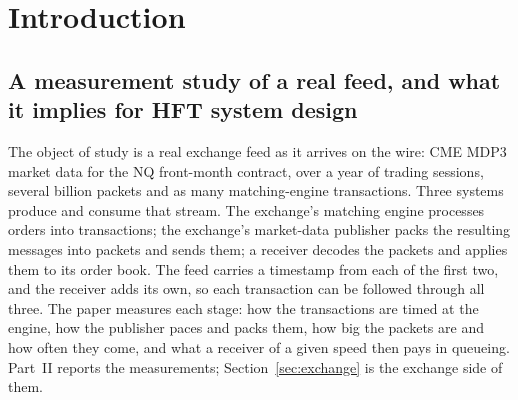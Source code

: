 \documentclass[11pt]{article}
\newcommand{\kasparhft}{\textsc{Kaspar-HFT}}
\begin{document}
\begin{abstract}
For system design, a receiver that handles every packet within one publisher period
does not queue on packet arrivals, however bursty the market; this is the design target.
Above the
publisher period a queueing tail appears and grows much faster than the service time. It
is produced by the timing of transactions, not by the packet rate, whose effect is
negligible at HFT service times, and not by packet size or packetisation. In this regime
the prevailing single-thread rule reverses: cutting the servicing chain into stages on separate threads
removes most of the tail for one hop on the median, only the slowest stage matters, and
for a stateless stage a pool of cores that each take whole packets does at least as
well. Just under the publisher period, where a production receiver that hands each packet
to a decoder thread runs, the tail that remains comes from packets of several messages,
decoded one after another, and from service times that vary from packet to packet; the
levers there are the cost per message and the spread of service, not the thread count.
The same receiver decoding on its socket-reader thread runs far below the period, about
$1\,\mu\mathrm{s}$ at the median per book update, which is the design target met with
margin. We give the analytic framework, a burst-limit
throughput identity and an exact pathwise reduction of the deterministic-service tandem
to a single bottleneck server, and test it on the corpus. Code is in the \kasparhft{}
repository; the packet captures are not redistributable.
\end{abstract}

\clearpage
\tableofcontents
\clearpage


\section{Introduction}
\label{sec:intro}

\subsection{A measurement study of a real feed, and what it implies for HFT system design}
\label{sec:intro-study}

The object of study is a real exchange feed as it arrives on the wire: CME MDP3 market
data for the NQ front-month contract, over a year of trading sessions, several billion
packets and as many matching-engine transactions. Three systems produce and consume that
stream. The exchange's matching engine processes orders into transactions; the exchange's
market-data publisher packs the resulting messages into packets and sends them; a
receiver decodes the packets and applies them to its order book. The feed carries a
timestamp from each of the first two, and the receiver adds its own, so each transaction
can be followed through all three. The paper measures each stage: how the transactions
are timed at the engine, how the publisher paces and packs them, how big the packets are
and how often they come, and what a receiver of a given speed then pays in queueing.
Part~II reports the measurements; Section~\ref{sec:exchange} is the exchange side of
them.
\end{document}
